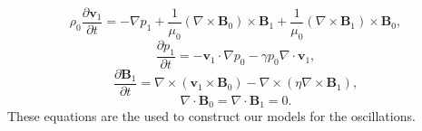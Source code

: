 \documentclass[12pt]{ociamthesis}
\begin{document}
\begin{equation}
\rho_0 \frac{\partial \boldsymbol{v}_1}{\partial t}  = - \nabla p_1 + \frac{1}{\mu_0} (\nabla \times \boldsymbol{B}_0) \times \boldsymbol{B}_1 + \frac{1}{\mu_0} (\nabla \times \boldsymbol{B}_1) \times \boldsymbol{B}_0 ,
\end{equation}
\begin{equation}
\frac{\partial p_1}{\partial t} = - \boldsymbol{v}_1 \cdot \nabla p_0 - \gamma p_0 \nabla \cdot \boldsymbol{v}_1 , 
\end{equation}
\begin{equation}
\frac{\partial \boldsymbol{B}_1}{\partial t} = \nabla \times (\boldsymbol{v}_1 \times \boldsymbol{B}_0) - \nabla \times (\eta \nabla \times \boldsymbol{B}_1) ,
\end{equation}
\begin{equation}
\nabla \cdot \boldsymbol{B}_0 = \nabla \cdot \boldsymbol{B}_1 = 0 .
\end{equation}
These equations are the used to construct our models for the oscillations. 
\end{document}
